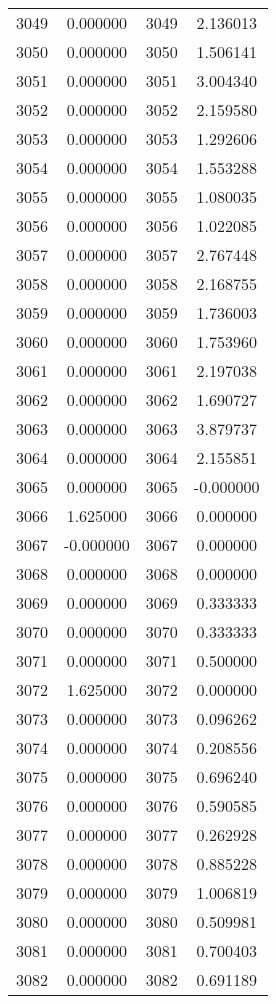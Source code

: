 \documentclass[12pt]{article}
\begin{document}
\begin{longtable}{@{}cccc@{}}
3049 & 0.000000 & 3049 & 2.136013 \\
3050 & 0.000000 & 3050 & 1.506141 \\
3051 & 0.000000 & 3051 & 3.004340 \\
3052 & 0.000000 & 3052 & 2.159580 \\
3053 & 0.000000 & 3053 & 1.292606 \\
3054 & 0.000000 & 3054 & 1.553288 \\
3055 & 0.000000 & 3055 & 1.080035 \\
3056 & 0.000000 & 3056 & 1.022085 \\
3057 & 0.000000 & 3057 & 2.767448 \\
3058 & 0.000000 & 3058 & 2.168755 \\
3059 & 0.000000 & 3059 & 1.736003 \\
3060 & 0.000000 & 3060 & 1.753960 \\
3061 & 0.000000 & 3061 & 2.197038 \\
3062 & 0.000000 & 3062 & 1.690727 \\
3063 & 0.000000 & 3063 & 3.879737 \\
3064 & 0.000000 & 3064 & 2.155851 \\
3065 & 0.000000 & 3065 & -0.000000 \\
3066 & 1.625000 & 3066 & 0.000000 \\
3067 & -0.000000 & 3067 & 0.000000 \\
3068 & 0.000000 & 3068 & 0.000000 \\
3069 & 0.000000 & 3069 & 0.333333 \\
3070 & 0.000000 & 3070 & 0.333333 \\
3071 & 0.000000 & 3071 & 0.500000 \\
3072 & 1.625000 & 3072 & 0.000000 \\
3073 & 0.000000 & 3073 & 0.096262 \\
3074 & 0.000000 & 3074 & 0.208556 \\
3075 & 0.000000 & 3075 & 0.696240 \\
3076 & 0.000000 & 3076 & 0.590585 \\
3077 & 0.000000 & 3077 & 0.262928 \\
3078 & 0.000000 & 3078 & 0.885228 \\
3079 & 0.000000 & 3079 & 1.006819 \\
3080 & 0.000000 & 3080 & 0.509981 \\
3081 & 0.000000 & 3081 & 0.700403 \\
3082 & 0.000000 & 3082 & 0.691189 \\

\end{longtable}
\end{document}
